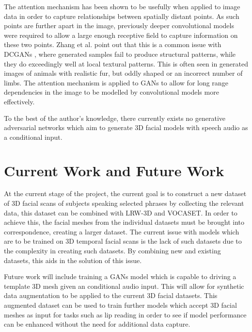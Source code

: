 \documentclass[12pt]{article}
\begin{document}
The attention mechanism \cite{Vaswani2017} has been shown to be usefully when applied to image data \cite{Xu2015} in order to capture relationships between spatially distant points.
As such points are further apart in the image, previously deeper convolutional models were required to allow a large enough receptive field to capture information on these two points.
Zhang et al. point out that this is a common issue with DCGANs \cite{Radford2016}, where generated samples fail to produce structural patterns, while they do exceedingly well at local textural patterns.
This is often seen in generated images of animals with realistic fur, but oddly shaped or an incorrect number of limbs.
The attention mechanism is applied to GANs \cite{Zhang2018} to allow for long range dependencies in the image to be modelled by convolutional models more effectively.

To the best of the author's knowledge, there currently exists no generative adversarial networks which aim to generate 3D facial models with speech audio as a conditional input.


\section{Current Work and Future Work}
At the current stage of the project, the current goal is to construct a new dataset of 3D facial scans of subjects speaking selected phrases by collecting the relevant data, this dataset can be combined with LRW-3D and VOCASET.
In order to achieve this, the facial meshes from the individual datasets must be brought into correspondence, creating a larger dataset.
The current issue with models which are to be trained on 3D temporal facial scans is the lack of such datasets due to the complexity in creating such datasets.
By combining new and existing datasets, this aids in the solution of this issue.

Future work will include training a GANs model which is capable to driving a template 3D mesh given an conditional audio input.
This will allow for synthetic data augmentation to be applied to the current 3D facial datasets.
This augmented dataset can be used to train further models which accept 3D facial meshes as input for tasks such as lip reading in order to see if model performance can be enhanced without the need for additional data capture.

\newpage



\end{document}

